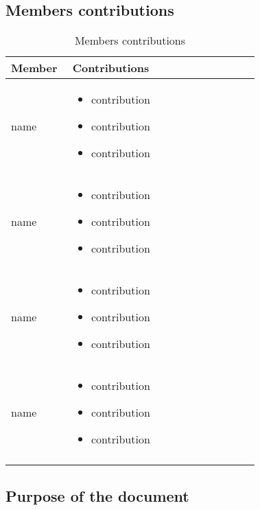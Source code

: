 \subsection{Members contributions}
\begin{longtable}
    {|m{0.23\linewidth}|m{0.7\linewidth}|}
            \hline
            \textbf{Member} & \textbf{Contributions}\\
            \hline
            \endhead
                name & \begin{itemize}
                    \item contribution
                    \item contribution
                    \item contribution
                \end{itemize} \\
            \hline
                 name & \begin{itemize}
                    \item contribution
                    \item contribution
                    \item contribution
                \end{itemize} \\
            \hline
                 name & \begin{itemize}
                    \item contribution
                    \item contribution
                    \item contribution
                \end{itemize} \\
            \hline
                name & \begin{itemize}
                    \item contribution
                    \item contribution
                    \item contribution
                \end{itemize} \\
            \hline
            \caption{Members contributions}
            \label{table:mem_contributions}
\end{longtable}

\subsection{Purpose of the document}

